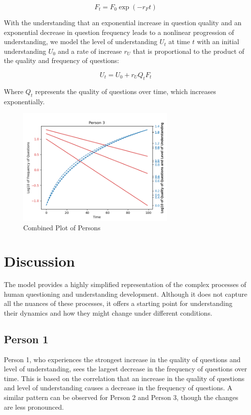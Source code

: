 \documentclass{article}
\begin{document}
    \[
        F_t = F_0 \exp(-r_F t)
    \]

    With the understanding that an exponential increase in question quality and an exponential decrease in question frequency leads to a nonlinear progression of understanding, we model the level of understanding $U_t$ at time $t$ with an initial understanding $U_0$ and a rate of increase $r_U$ that is proportional to the product of the quality and frequency of questions:

    \[
        U_t = U_0 + r_U Q_t F_t
    \]

    Where $Q_t$ represents the quality of questions over time, which increases exponentially.

    \begin{figure}[ht]
        \centering
        \includegraphics[width=0.7\textwidth]{combined_plot.png}
        \caption{Combined Plot of Persons}
        \label{fig:combinedplot}
    \end{figure}


    \section{Discussion}

    The model provides a highly simplified representation of the complex processes of human questioning and understanding development. Although it does not capture all the nuances of these processes, it offers a starting point for understanding their dynamics and how they might change under different conditions.

    \subsection{Person 1}

    Person 1, who experiences the strongest increase in the quality of questions and level of understanding, sees the largest decrease in the frequency of questions over time. This is based on the correlation that an increase in the quality of questions and level of understanding causes a decrease in the frequency of questions. A similar pattern can be observed for Person 2 and Person 3, though the changes are less pronounced.
\end{document}
